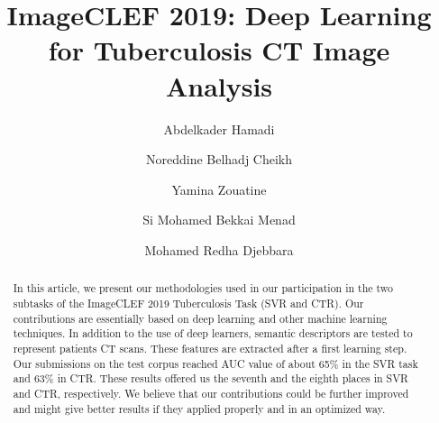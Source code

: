\documentclass{llncs}
\begin{document}
%
\title{ImageCLEF 2019: Deep Learning for Tuberculosis CT Image Analysis}
%
%
\author{Abdelkader Hamadi \and Noreddine Belhadj Cheikh \and Yamina Zouatine \and Si Mohamed Bekkai Menad \and Mohamed Redha Djebbara}




%
%




%
\maketitle              %
%
\begin{abstract}
In this article, we present our methodologies used in our participation in the two subtasks of the ImageCLEF 2019 Tuberculosis Task (SVR and CTR). Our contributions are essentially based on deep learning and other machine learning techniques. In addition to the use of deep learners, semantic descriptors are tested to represent patients CT scans. These features are extracted after a first learning step. Our submissions on the test corpus reached AUC value of about 65\% in the SVR task and 63\% in CTR. These results offered us the seventh and the eighth places in SVR and CTR, respectively. We believe that our contributions could be further improved and might give better results if they applied properly and in an optimized way.

\end{abstract}
%
%
%
\end{document}
